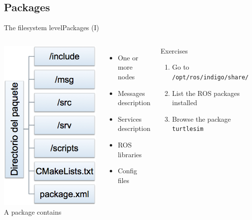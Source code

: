 \documentclass[10pt,compress]{beamer} %
\begin{document}
\subsection{Packages}
\begin{frame}{The filesystem level}{Packages (I)}
    \begin{columns}
			\centering\includegraphics[width=0.9\linewidth]{figs/package.png}
	A package contains
  	\begin{itemize}
		\item One or more nodes
		\item Messages description
		\item Services description
		\item ROS libraries
		\item Config files
	\end{itemize}
	\begin{block}{Exercises}
	\begin{enumerate}
		\item Go to \texttt{/opt/ros/indigo/share/}
		\item List the ROS packages installed
		\item Browse the package \texttt{turtlesim}
	\end{enumerate}
	\end{block}
	\end{columns}
\end{frame}
\end{document}
